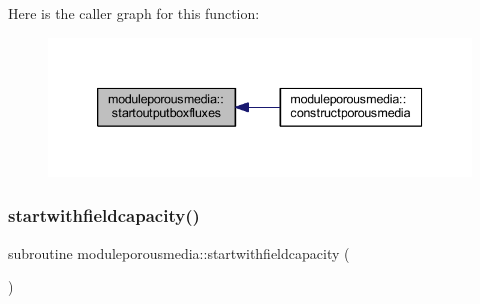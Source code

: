 Here is the caller graph for this function\+:\nopagebreak
\begin{figure}[H]
\begin{center}
\leavevmode
\includegraphics[width=339pt]{namespacemoduleporousmedia_a964d0ccee02d1c5d84e0ea29ec30b3e7_icgraph}
\end{center}
\end{figure}
\mbox{\label{namespacemoduleporousmedia_af2c381d3df927d5f0eb263a6fe3b13a7}} 
\subsubsection{\texorpdfstring{startwithfieldcapacity()}{startwithfieldcapacity()}}
{\footnotesize\ttfamily subroutine moduleporousmedia\+::startwithfieldcapacity (\begin{DoxyParamCaption}{ }\end{DoxyParamCaption})\hspace{0.3cm}{\ttfamily [private]}}

